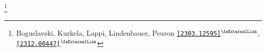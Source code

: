 \documentclass[aspectratio=169,11pt,usenames,dvipsnames]{beamer}
\renewcommand{\thefootnote}{\color{customblue}\faPaperPlaneO}
\newcommand\blfootnote[1]{%
  \begingroup
  \renewcommand\thefootnote{}\footnote{#1}%
  \addtocounter{footnote}{-1}%
  \endgroup
}
\begin{document}
\begin{frame}[noframenumbering]
\begin{columns}[onlytextwidth,t]
\begin{figure}[!hbt]
        \end{figure}
    \end{columns}   
    \blfootnote{\scriptsize Boguslavski, Kurkela, Lappi, Lindenbauer, Peuron \href{https://arxiv.org/abs/2303.12595}{{\color{ForestGreen}\texttt{[2303.12595]}$^\text{\scalebox{0.9}{\faExternalLink}}$}}, \href{https://arxiv.org/abs/2312.00447}{{\color{ForestGreen}\texttt{[2312.00447]}$^\text{\scalebox{0.9}{\faExternalLink}}$}}}
\end{frame}




\end{document}

